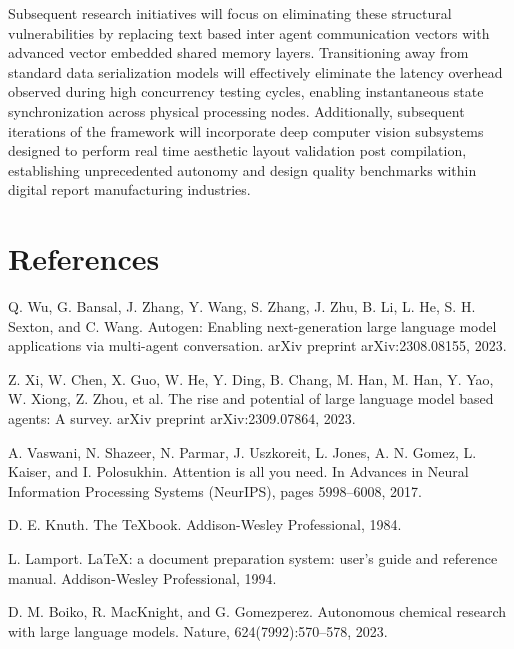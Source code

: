 Subsequent research initiatives will focus on eliminating these structural vulnerabilities by replacing text based inter agent communication vectors with advanced vector embedded shared memory layers. Transitioning away from standard data serialization models will effectively eliminate the latency overhead observed during high concurrency testing cycles, enabling instantaneous state synchronization across physical processing nodes. Additionally, subsequent iterations of the framework will incorporate deep computer vision subsystems designed to perform real time aesthetic layout validation post compilation, establishing unprecedented autonomy and design quality benchmarks within digital report manufacturing industries.

\newpage
\section*{References}

\noindent [1] Q. Wu, G. Bansal, J. Zhang, Y. Wang, S. Zhang, J. Zhu, B. Li, L. He, S. H. Sexton, and C. Wang. Autogen: Enabling next-generation large language model applications via multi-agent conversation. arXiv preprint arXiv:2308.08155, 2023.

\vspace{0.3cm}
\noindent [2] Z. Xi, W. Chen, X. Guo, W. He, Y. Ding, B. Chang, M. Han, M. Han, Y. Yao, W. Xiong, Z. Zhou, et al. The rise and potential of large language model based agents: A survey. arXiv preprint arXiv:2309.07864, 2023.

\vspace{0.3cm}
\noindent [3] A. Vaswani, N. Shazeer, N. Parmar, J. Uszkoreit, L. Jones, A. N. Gomez, L. Kaiser, and I. Polosukhin. Attention is all you need. In Advances in Neural Information Processing Systems (NeurIPS), pages 5998--6008, 2017.

\vspace{0.3cm}
\noindent [4] D. E. Knuth. The TeXbook. Addison-Wesley Professional, 1984.

\vspace{0.3cm}
\noindent [5] L. Lamport. LaTeX: a document preparation system: user's guide and reference manual. Addison-Wesley Professional, 1994.

\vspace{0.3cm}
\noindent [6] D. M. Boiko, R. MacKnight, and G. Gomezperez. Autonomous chemical research with large language models. Nature, 624(7992):570--578, 2023.

